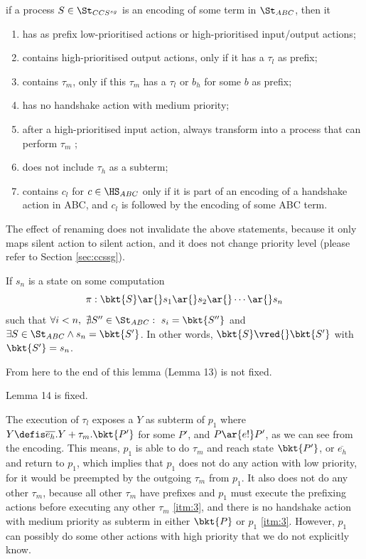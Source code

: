   if a process $S\in\St_{CCS^{sg}}$ is an encoding of some term in $\St_{ABC}$, then it
  \begin{enumerate}[(1)]
    \item \label{itm:1} has as prefix low-prioritised actions or high-prioritised input/output actions;
    \item \label{itm:2} contains high-prioritised output actions, only if it has a $\tau_l$ as prefix;
    \item \label{itm:3} contains $\tau_m$, only if this $\tau_m$ has a $\tau_l$ or $b_h$ for some $b$ as prefix;
    \item \label{itm:4} has no handshake action with medium priority;
    \item \label{itm:5} after a high-prioritised input action, always transform into a process that can perform $\tau_m$ ;
    \item \label{itm:6} does not include $\tau_h$ as a subterm;
    \item \label{itm:7} contains $c_l$ for $c\in\HS_{ABC}$ only if it is part of an encoding of a handshake action in ABC, and $c_l$ is followed by the encoding of some ABC term.
  \end{enumerate}

  The effect of renaming does not invalidate the above statements, because it only maps silent action to silent action, and it does not change priority level (please refer to Section \ref{sec:ccssg}).











      If $s_n$ is a state on some computation
      \[
      \pi : \bkt{S} \ar{} s_1 \ar{} s_2 \ar{} \cdots \ar{} s_n
      \]
      such that $\forall i < n,\ \nexists S''\in\St_{ABC}:\ s_i = \bkt{S''}$ and $\exists S\in\St_{ABC} \wedge s_n = \bkt{S'}$.
      In other words, $\bkt{S}\vred{}\bkt{S'}$ with $\bkt{S'}=s_n$.

  \begin{shaded}
    From here to the end of this lemma (Lemma 13) is not fixed.


    Lemma 14 is fixed.
  \end{shaded}

  The execution of $\tau_l$ exposes a $Y$ as subterm of $p_1$ where $Y\defis \overline{e_h}.Y + \tau_m.\bkt{P'}$ for some $P'$, and $P\ar{e!}P'$, as we can see from the encoding.
  This means, $p_1$ is able to do $\tau_m$ and reach state $\bkt{P'}$, or $\overline{e_h}$ and return to $p_1$, which implies that $p_1$ does not do any action with low priority, for it would be preempted by the outgoing $\tau_m$ from $p_1$.
  It also does not do any other $\tau_m$, because all other $\tau_m$ have prefixes and $p_1$ must execute the prefixing actions before executing any other $\tau_m$ \ref{itm:3}, and there is no handshake action with medium priority as subterm in either $\bkt{P}$ or $p_1$ \ref{itm:3}.
  However, $p_1$ can possibly do some other actions with high priority that we do not explicitly know.

